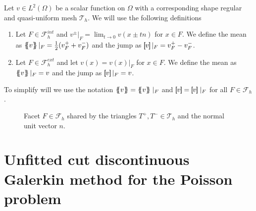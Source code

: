 \begin{definition}
    Let $v\in L^2( \Omega ) $ be a scalar function on $\Omega$ with a corresponding shape regular and quasi-uniform mesh $\mathcal{T}_{h} $. We will use the following definitions
    \begin{enumerate}[label=\arabic*)]
        \item Let $F \in \mathcal{F}^{int} _{h}$ and $v^{\pm}| _{F} = \lim_{t\to 0} v( x \pm tn)   $ for $x \in F$. We define the mean as $\left\{\!\!\left\{ v\right\}\!\!\right\} |_{F} = \frac{1}{2} (v^{+}_{F} + v^{-}_{F})   $ and the jump as $\left[\!\!\left[ v \right]\!\!\right]|_{F} =  v^{+}_{F} - v^{-}_{F} $.
        \item Let $F \in \mathcal{F}^{ext} _{h}$ and let $ v( x) =  v(x)|_{F} $ for  $x \in F$.
We define the mean as $\left\{\!\!\left\{ v\right\}\!\!\right\} |_{F} = v    $ and the jump as $\left[\!\!\left[ v \right]\!\!\right]|_{F} = v$.

    \end{enumerate}
    To simplify will we use the notation $\mean{ v } = \mean{ v } \mid _{F}    $ and $\jump{ v } = \jump{ v } \mid _{F}    $ for all $F \in \mathcal{F} _{h}$.

\end{definition}




\begin{figure}[!h]
\centering
{}

\caption{Facet $F \in \mathcal{F}_h $ shared by the triangles $T^{+}, T^{-} \in \mathcal{T}_{h} $ and the normal unit vector $n$.  }
    \label{fig:normal}
\end{figure}


\newpage
\section{Unfitted cut discontinuous Galerkin method for the Poisson problem}%
\label{sec:elliptic}

